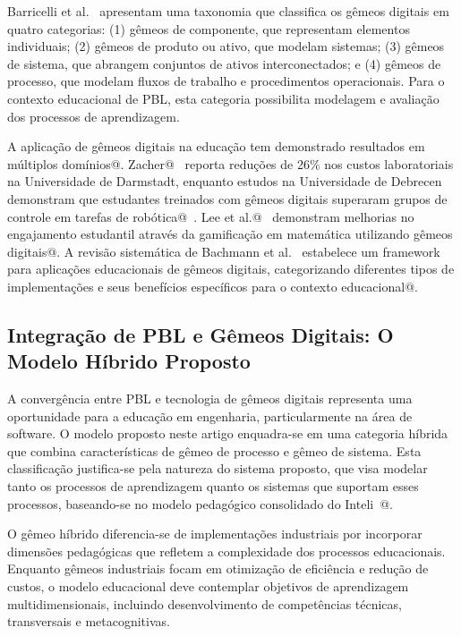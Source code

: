 \documentclass[english, spanish, brazilian]{modelo_dt}
\begin{document}
Barricelli et al.\@~\parencite{barricelli2019systematic} apresentam uma taxonomia que classifica os gêmeos digitais em quatro categorias: (1) gêmeos de componente, que representam elementos individuais; (2) gêmeos de produto ou ativo, que modelam sistemas; (3) gêmeos de sistema, que abrangem conjuntos de ativos interconectados; e (4) gêmeos de processo, que modelam fluxos de trabalho e procedimentos operacionais\@. Para o contexto educacional de PBL, esta categoria possibilita modelagem e avaliação dos processos de aprendizagem\@.

A aplicação de gêmeos digitais na educação tem demonstrado resultados em múltiplos domínios@. Zacher@~\parencite{zacher2020digital} reporta reduções de 26\% nos custos laboratoriais na Universidade de Darmstadt, enquanto estudos na Universidade de Debrecen demonstram que estudantes treinados com gêmeos digitais superaram grupos de controle em tarefas de robótica@~\parencite{kolivand2021reimaging}. Lee et al.@~\parencite{hannula2022applied} demonstram melhorias no engajamento estudantil através da gamificação em matemática utilizando gêmeos digitais@. A revisão sistemática de Bachmann et al.~\parencite{bachmann2024digital} estabelece um framework para aplicações educacionais de gêmeos digitais, categorizando diferentes tipos de implementações e seus benefícios específicos para o contexto educacional@.

\subsection{Integração de PBL e Gêmeos Digitais: O Modelo Híbrido Proposto}

A convergência entre PBL e tecnologia de gêmeos digitais representa uma oportunidade para a educação em engenharia, particularmente na área de software\@. O modelo proposto neste artigo enquadra-se em uma categoria híbrida que combina características de gêmeo de processo e gêmeo de sistema\@. Esta classificação justifica-se pela natureza do sistema proposto, que visa modelar tanto os processos de aprendizagem quanto os sistemas que suportam esses processos, baseando-se no modelo pedagógico consolidado do Inteli~\parencite{valente2025ensino}@.

O gêmeo híbrido diferencia-se de implementações industriais por incorporar dimensões pedagógicas que refletem a complexidade dos processos educacionais\@. Enquanto gêmeos industriais focam em otimização de eficiência e redução de custos, o modelo educacional deve contemplar objetivos de aprendizagem multidimensionais, incluindo desenvolvimento de competências técnicas, transversais e metacognitivas\@.
\end{document}
